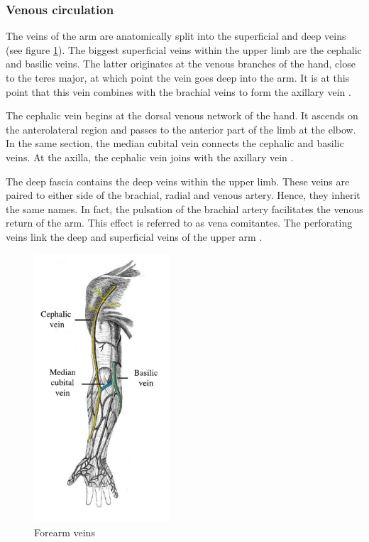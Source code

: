 \subsubsection{Venous circulation}
The veins of the arm are anatomically split into the superficial and deep veins (see figure \ref{fig:arm veind}). The biggest superficial veins within the upper limb are the cephalic and basilic veins. The latter originates at the venous branches of the hand, close to the teres major, at which point the vein goes deep into the arm. It is at this point that this vein combines with the brachial veins to form the axillary vein \cite{scanlon2014essentials}. 

The cephalic vein begins at the dorsal venous network of the hand. It ascends on the anterolateral region and passes to the anterior part of the limb at the elbow. In the same section, the median cubital vein connects the cephalic and basilic veins. At the axilla, the cephalic vein joins with the axillary vein \cite{scanlon2014essentials}. 

The deep fascia contains the deep veins within the upper limb. These veins are paired to either side of the brachial, radial and venous artery. Hence, they inherit the same names.  In fact, the pulsation of the brachial artery facilitates the venous return of the arm. This effect is referred to as vena comitantes. The perforating veins link the deep and superficial veins of the upper arm \cite{scanlon2014essentials}. 

\begin{figure}[!htpb]
	\centering
	\includegraphics[height=10cm,keepaspectratio]{figure21}
	\caption{Forearm veins}
	\label{fig:arm veind}
\end{figure} 

